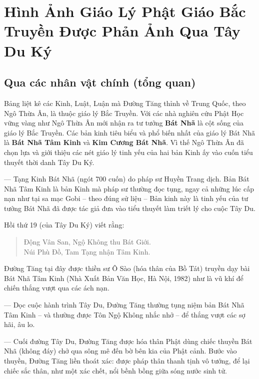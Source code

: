 \chapter{Hình Ảnh Giáo Lý Phật Giáo Bắc Truyền Được Phản Ảnh Qua Tây Du Ký} %
\label{cha:hinh_anh_giao_ly_phat_giao_bac_truyen}

\section{Qua các nhân vật chính (tổng quan)} %
\label{sec:qua_cac_nhan_vat_chinh}

Bảng liệt kê các Kinh, Luật, Luận mà Đường Tăng thỉnh về Trung Quốc, theo Ngô Thừa Ân, là thuộc giáo lý Bắc Truyền. Với các nhà nghiên cứu Phật Học vững vàng như Ngô Thừa Ân mới nhận ra tư tưởng {\bf Bát Nhã} là cột sống của giáo lý Bắc Truyền. Các bản kinh tiêu biểu và phổ biến nhất của giáo lý Bát Nhã là {\bf Bát Nhã Tâm Kinh} và {\bf Kim Cương Bát Nhã}. Vì thế Ngô Thừa Ân đã chọn lựa và giới thiệu các nét giáo lý tinh yếu của hai bản Kinh ấy vào cuốn tiểu thuyết thời danh Tây Du Ký.

--- Tạng Kinh Bát Nhã (ngót 700 cuốn) do pháp sư Huyền Trang dịch. Bản Bát Nhã Tâm Kinh là bản Kinh mà pháp sư thường đọc tụng, ngay cả những lúc cấp nạn như tại sa mạc Gobi -- theo đúng sử liệu -- Bản kinh này là tinh yếu của tư tưởng Bát Nhã đã được tác giả đưa vào tiểu thuyết làm triết lý cho cuộc Tây Du.

Hồi thứ 19 (của Tây Du Ký) viết rằng:

\begin{verse}
\begin{itshape}
Động Vân San, Ngộ Không thu Bát Giới.\\
Núi Phù Đồ, Tam Tạng nhận Tâm Kinh.
\end{itshape}
\end{verse}

Đường Tăng tại đây được thiền sư Ô Sào (hóa thân của Bồ Tát) truyền dạy bài Bát Nhã Tâm Kinh (Nhà Xuất Bản Văn Học, Hà Nội, 1982) như là vũ khí để chiến thắng vượt qua các ách nạn.

--- Dọc cuộc hành trình Tây Du, Đường Tăng thường tụng niệm bản Bát Nhã Tâm Kinh -- và thường được Tôn Ngộ Không nhắc nhở -- để thắng vượt các sợ hãi, âu lo.

--- Cuối đường Tây Du, Đường Tăng được hóa thân Phật dùng chiếc thuyền Bát Nhã (không đáy) chở qua sông mê đến bờ bên kia của Phật cảnh. Bước vào thuyền, Đường Tăng liền thoát xác: được pháp thân thanh tịnh vô tướng, để lại chiếc sắc thân, như một xác chết, nổi bềnh bồng giữa sóng nước sinh tử.

